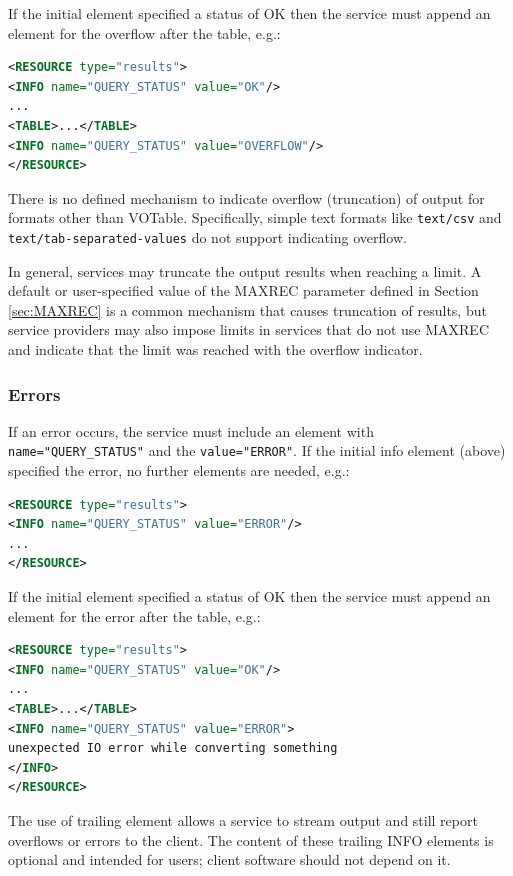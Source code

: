\documentclass[11pt,letter]{ivoa}
\begin{document}
If the initial  element specified a status of OK then the service must
append an  element for the overflow after the table, e.g.:

\begin{lstlisting}[language=XML]
<RESOURCE type="results">
<INFO name="QUERY_STATUS" value="OK"/>
...
<TABLE>...</TABLE>
<INFO name="QUERY_STATUS" value="OVERFLOW"/>
</RESOURCE>
\end{lstlisting}

There is no defined mechanism to indicate overflow (truncation) of output for formats
other than VOTable. Specifically, simple text formats like \verb|text/csv| and
\verb|text/tab-separated-values| do not support indicating overflow.

In general, services may truncate the output results when reaching a limit. A default or
user-specified value of the MAXREC parameter defined in Section \ref{sec:MAXREC}
is a common mechanism that causes truncation
of results, but service providers may also impose limits in services that do not use
MAXREC and indicate that the limit was reached with the overflow indicator.


\subsubsection{Errors}
\label{sect:errors}

If an error occurs, the service must include an  element with
\verb|name="QUERY_STATUS"| and the \verb|value="ERROR"|. If the initial info element (above)
specified the error, no further elements are needed, e.g.:

\begin{lstlisting}[language=XML]
<RESOURCE type="results">
<INFO name="QUERY_STATUS" value="ERROR"/>
...
</RESOURCE>
\end{lstlisting}

If the initial  element specified a status of OK then the service must
append an  element for the error after the table, e.g.:

\begin{lstlisting}[language=XML]
<RESOURCE type="results">
<INFO name="QUERY_STATUS" value="OK"/>
...
<TABLE>...</TABLE>
<INFO name="QUERY_STATUS" value="ERROR">
unexpected IO error while converting something
</INFO>
</RESOURCE>
\end{lstlisting}

The use of trailing  element allows a service to stream output and still
report overflows or errors to the client. The content of these trailing INFO
elements is optional and intended for users; client software should not depend
on it.
\end{document}
